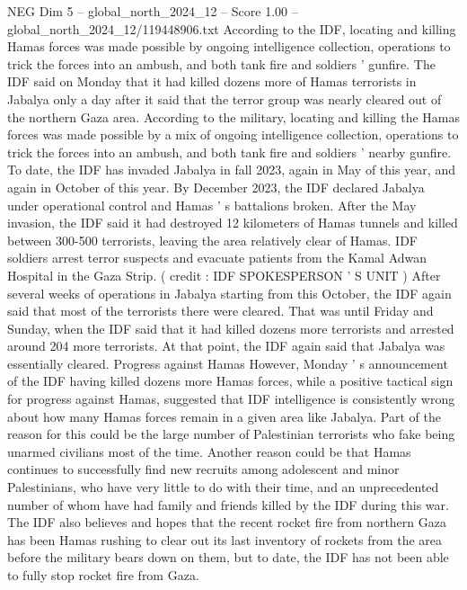 \begin{textsample}{NEG Dim 5 – global\_north\_2024\_12 – Score 1.00 – global\_north\_2024\_12/119448906.txt}  \label{ex:f5_neg_357}
According to the IDF, locating and killing Hamas forces was made possible by ongoing intelligence collection, operations to trick the forces into an ambush, and both tank fire and soldiers ' gunfire.
The IDF said on Monday that it had killed dozens more of Hamas terrorists in Jabalya only a day after it said that the terror group was nearly cleared out of the northern Gaza area.
According to the military, locating and killing the Hamas forces was made possible by a mix of ongoing intelligence collection, operations to trick the forces into an ambush, and both tank fire and soldiers ' nearby gunfire.
To date, the IDF has invaded Jabalya in fall 2023, again in May of this year, and again in October of this year.
By December 2023, the IDF declared Jabalya under operational control and Hamas ' s battalions broken.
After the May invasion, the IDF said it had destroyed 12 kilometers of Hamas tunnels and killed between 300-500 terrorists, leaving the area relatively clear of Hamas.
IDF soldiers arrest terror suspects and evacuate patients from the Kamal Adwan Hospital in the Gaza Strip. ( credit : IDF SPOKESPERSON ' S UNIT ) After several weeks of operations in Jabalya starting from this October, the IDF again said that most of the terrorists there were cleared.
That was until Friday and Sunday, when the IDF said that it had killed dozens more terrorists and arrested around 204 more terrorists.
At that point, the IDF again said that Jabalya was essentially cleared.
Progress against Hamas However, Monday ' s announcement of the IDF having killed dozens more Hamas forces, while a positive tactical sign for progress against Hamas, suggested that IDF intelligence is consistently wrong about how many Hamas forces remain in a given area like Jabalya.
Part of the reason for this could be the large number of Palestinian terrorists who fake being unarmed civilians most of the time.
Another reason could be that Hamas continues to successfully find new recruits among adolescent and minor Palestinians, who have very little to do with their time, and an unprecedented number of whom have had family and friends killed by the IDF during this war.
The IDF also believes and hopes that the recent rocket fire from northern Gaza has been Hamas rushing to clear out its last inventory of rockets from the area before the military bears down on them, but to date, the IDF has not been able to fully stop rocket fire from Gaza.

\end{textsample}
